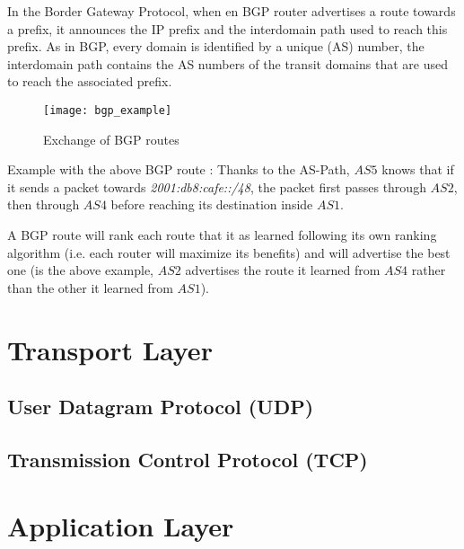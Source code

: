 In the Border Gateway Protocol, when en BGP router advertises a route towards a prefix, it announces the IP prefix and the interdomain path used to reach this prefix. As in BGP, every domain is identified by a unique  (AS) number, the interdomain path contains the AS numbers of the transit domains that are used to reach the associated prefix.

\begin{figure}[H]
	\centering
	\texttt{[image: bgp\_example]}
	\caption{Exchange of BGP routes}
\end{figure}

Example with the above BGP route : Thanks to the AS-Path, $AS5$ knows that if it sends a packet towards \textit{2001:db8:cafe::/48}, the packet first passes through $AS2$, then through $AS4$ before reaching its destination inside $AS1$.

A BGP route will rank each route that it as learned following its own ranking algorithm (i.e. each router will maximize its benefits) and will advertise the best one (is the above example, $AS2$ advertises the route it learned from $AS4$ rather than the other it learned from $AS1$).

\section{Transport Layer}

\subsection[UDP]{User Datagram Protocol (UDP)}



\subsection[TCP]{Transmission Control Protocol (TCP)}



\section{Application Layer}


